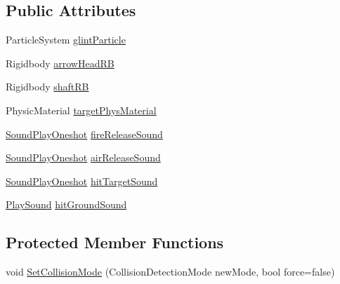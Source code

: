 \subsection*{Public Attributes}
\begin{DoxyCompactItemize}
\item 
Particle\+System \mbox{\hyperlink{class_valve_1_1_v_r_1_1_interaction_system_1_1_arrow_a0ab62133f97ec701f82409db5976e17b}{glint\+Particle}}
\item 
Rigidbody \mbox{\hyperlink{class_valve_1_1_v_r_1_1_interaction_system_1_1_arrow_a6adc836d57ae24b6d1b196cdb1f9dba1}{arrow\+Head\+RB}}
\item 
Rigidbody \mbox{\hyperlink{class_valve_1_1_v_r_1_1_interaction_system_1_1_arrow_a6c27c4428a3bc6485bd112f591218708}{shaft\+RB}}
\item 
Physic\+Material \mbox{\hyperlink{class_valve_1_1_v_r_1_1_interaction_system_1_1_arrow_ae6a1bda880707184acbb465614e7131a}{target\+Phys\+Material}}
\item 
\mbox{\hyperlink{class_valve_1_1_v_r_1_1_interaction_system_1_1_sound_play_oneshot}{Sound\+Play\+Oneshot}} \mbox{\hyperlink{class_valve_1_1_v_r_1_1_interaction_system_1_1_arrow_ae43108164ba6139ae2df09968c76f69f}{fire\+Release\+Sound}}
\item 
\mbox{\hyperlink{class_valve_1_1_v_r_1_1_interaction_system_1_1_sound_play_oneshot}{Sound\+Play\+Oneshot}} \mbox{\hyperlink{class_valve_1_1_v_r_1_1_interaction_system_1_1_arrow_a29537a218aa3ee7f6b9ca4a3af383300}{air\+Release\+Sound}}
\item 
\mbox{\hyperlink{class_valve_1_1_v_r_1_1_interaction_system_1_1_sound_play_oneshot}{Sound\+Play\+Oneshot}} \mbox{\hyperlink{class_valve_1_1_v_r_1_1_interaction_system_1_1_arrow_a767632ea6897d5bef27d8c1043a54869}{hit\+Target\+Sound}}
\item 
\mbox{\hyperlink{class_valve_1_1_v_r_1_1_interaction_system_1_1_play_sound}{Play\+Sound}} \mbox{\hyperlink{class_valve_1_1_v_r_1_1_interaction_system_1_1_arrow_aa696d5407b1ed7aad65494328b73c36e}{hit\+Ground\+Sound}}
\end{DoxyCompactItemize}
\subsection*{Protected Member Functions}
\begin{DoxyCompactItemize}
\item 
void \mbox{\hyperlink{class_valve_1_1_v_r_1_1_interaction_system_1_1_arrow_a202aba7427eea1165521de831008922f}{Set\+Collision\+Mode}} (Collision\+Detection\+Mode new\+Mode, bool force=false)
\end{DoxyCompactItemize}


